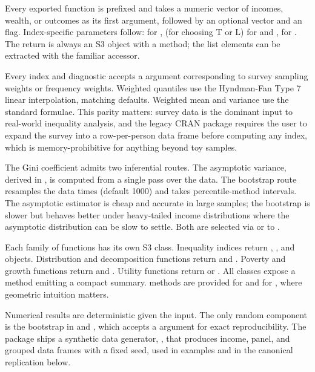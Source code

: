 Every exported function is prefixed  and takes a numeric
vector of incomes, wealth, or outcomes as its first argument, followed
by an optional  vector and an  flag.
Index-specific parameters follow:  for
,  (for choosing T or L) for
 and ,  for
. The return is always an S3 object with a
 method; the list elements can be extracted with the
familiar \code{\$} accessor.

Every index and diagnostic accepts a  argument
corresponding to survey sampling weights or frequency weights.
Weighted quantiles use the Hyndman-Fan Type 7 linear interpolation,
matching  defaults. Weighted mean and variance
use the standard formulae. This parity matters: survey data is the
dominant input to real-world inequality analysis, and the legacy CRAN
package  requires the user to expand the survey into a
row-per-person data frame before computing any index, which is
memory-prohibitive for anything beyond toy samples.

The Gini coefficient admits two inferential routes. The asymptotic
variance, derived in \citet{davidson2009reliable}, is computed from a single
pass over the data. The bootstrap route resamples the data
 times (default 1000) and takes percentile-method intervals.
The asymptotic estimator is cheap and accurate in large samples; the
bootstrap is slower but behaves better under heavy-tailed income
distributions where the asymptotic distribution can be slow to
settle. Both are selected via  or
 to .

Each family of functions has its own S3 class. Inequality indices
return , , and 
objects. Distribution and decomposition functions return
 and . Poverty and growth
functions return  and .
Utility functions return  or
. All classes expose a 
method emitting a compact summary.  methods are
provided for  and for
, where geometric intuition matters.

Numerical results are deterministic given the input. The only random
component is the bootstrap in  and
, which accepts a  argument for exact
reproducibility. The package ships a synthetic data generator,
, that produces income, panel, and grouped
data frames with a fixed seed, used in examples and in the canonical
replication below.


